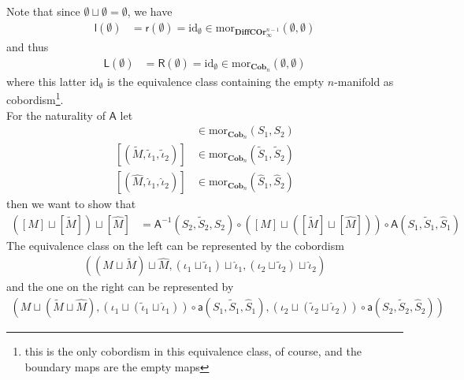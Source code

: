 Note that since $\emptyset \sqcup \emptyset = \emptyset$, we have
\begin{align*}
  \mathsf{l}(\emptyset)
  &=
  \mathsf{r}(\emptyset)
  =
  \mathrm{id}_{\emptyset}
  \in
  \mathrm{mor}_{\mathbf{DiffCOr}_{\infty}^{n-1}}
  \left(
    \emptyset
    ,
    \emptyset
  \right)
\end{align*}
and thus
\begin{align*}
  \mathsf{L}(\emptyset)
  &=
  \mathsf{R}(\emptyset)
  =
  \mathrm{id}_{\emptyset}
  \in
  \mathrm{mor}_{\mathbf{Cob}_{n}}
  \left(
    \emptyset
    ,
    \emptyset
  \right)
\end{align*}
where this latter $\mathrm{id}_{\emptyset}$ is the equivalence class containing the empty $n$-manifold as cobordism\footnote{this is the only cobordism in this equivalence class, of course, and the boundary maps are the empty maps}.
\\
For the naturality of $\mathsf{A}$ let
\begin{align*}
  [(M,\iota_{1},\iota_{2})]
  &\in
  \mathrm{mor}_{\mathbf{Cob}_{n}}(S_{1},S_{2})
  \\
  [(\tilde{M},\tilde{\iota}_{1},\tilde{\iota}_{2})]
  &\in
  \mathrm{mor}_{\mathbf{Cob}_{n}}(\tilde{S}_{1},\tilde{S}_{2})
  \\
  [(\hat{M},\hat{\iota}_{1},\hat{\iota}_{2})]
  &\in
  \mathrm{mor}_{\mathbf{Cob}_{n}}(\hat{S}_{1},\hat{S}_{2})
\end{align*}
then we want to show that
\begin{align*}
  \left(
    [M]
    \sqcup
    [\tilde{M}]
  \right)
  \sqcup
  [\hat{M}]
  &=
  \mathsf{A}^{-1}(S_{2},\tilde{S}_{2},\hat{S}_{2})
  \circ
  \left(
    [M]
    \sqcup
    \left(
      [\tilde{M}]
      \sqcup
      [\hat{M}]
    \right)
  \right)
  \circ
  \mathsf{A}(S_{1},\tilde{S}_{1},\hat{S}_{1})
\end{align*}
The equivalence class on the left can be represented by the cobordism
\begin{align*}
  \left(
    (M \sqcup \tilde{M})
    \sqcup
    \hat{M}
    ,
    (\iota_{1} \sqcup \tilde{\iota}_{1})
    \sqcup
    \hat{\iota}_{1}
    ,
    (\iota_{2} \sqcup \tilde{\iota}_{2})
    \sqcup
    \hat{\iota}_{2}
  \right)
\end{align*}
and the one on the right can be represented by
\begin{align*}
  \left(
    M
    \sqcup
    (\tilde{M} \sqcup \hat{M})
    ,
    (\iota_{1} \sqcup (\tilde{\iota}_{1} \sqcup \hat{\iota}_{1}))
    \circ
    \mathsf{a}(S_{1},\tilde{S}_{1},\hat{S}_{1})
    ,
    (\iota_{2} \sqcup (\tilde{\iota}_{2} \sqcup \hat{\iota}_{2}))
    \circ
    \mathsf{a}(S_{2},\tilde{S}_{2},\hat{S}_{2})
  \right)
\end{align*}
